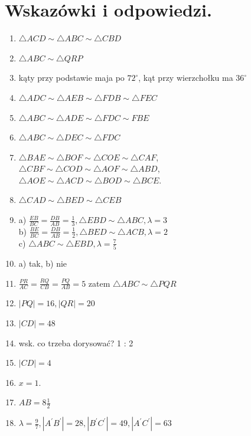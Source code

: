 \documentclass[10pt]{article}
\begin{document}
\section*{Wskazówki i odpowiedzi.}
\begin{enumerate}
  \item \(\triangle A C D \sim \triangle A B C \sim \triangle C B D\)
  \item \(\triangle A B C \sim \triangle Q R P\)
  \item kąty przy podstawie maja po \(72^{\circ}\), kąt przy wierzchołku ma \(36^{\circ}\)
  \item \(\triangle A D C \sim \triangle A E B \sim \triangle F D B \sim \triangle F E C\)
  \item \(\triangle A B C \sim \triangle A D E \sim \triangle F D C \sim F B E\)
  \item \(\triangle A B C \sim \triangle D E C \sim \triangle F D C\)
  \item \(\triangle B A E \sim \triangle B O F \sim \triangle C O E \sim \triangle C A F\),\\
\(\triangle C B F \sim \triangle C O D \sim \triangle A O F \sim \triangle A B D\),\\
\(\triangle A O E \sim \triangle A C D \sim \triangle B O D \sim \triangle B C E\).
  \item \(\triangle C A D \sim \triangle B E D \sim \triangle C E B\)
  \item a) \(\frac{E B}{B C}=\frac{D B}{A B}=\frac{1}{3}, \triangle E B D \sim \triangle A B C, \lambda=3\)\\
b) \(\frac{B E}{B C}=\frac{D B}{A B}=\frac{1}{2}, \triangle B E D \sim \triangle A C B, \lambda=2\)\\
c) \(\triangle A B C \sim \triangle E B D, \lambda=\frac{7}{5}\)
  \item a) tak, b) nie
  \item \(\frac{P R}{A C}=\frac{R Q}{C B}=\frac{P Q}{A B}=5\) zatem \(\triangle A B C \sim \triangle P Q R\)
  \item \(|P Q|=16,|Q R|=20\)
  \item \(|C D|=48\)
  \item wsk. co trzeba dorysować? 1 : 2
  \item \(|C D|=4\)
  \item \(x=1\).
  \item \(A B=8 \frac{1}{2}\)
  \item \(\lambda=\frac{9}{7},\left|A^{\prime} B^{\prime}\right|=28,\left|B^{\prime} C^{\prime}\right|=49,\left|A^{\prime} C^{\prime}\right|=63\)

\end{enumerate}
\end{document}
